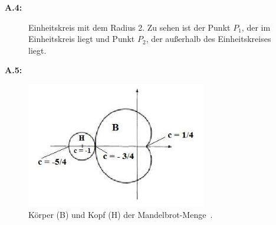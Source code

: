 \noindent\textbf{A.4:}\label{app:4}
\begin{figure}[H]\label{fig:escape-radius}
  \begin{center}
    \caption{
      Einheitskreis mit dem Radius 2. Zu sehen ist der Punkt $P_1$, der im
      Einheitskreis liegt und Punkt $P_2$, der außerhalb des Einheitskreises liegt.
    }
  \end{center}
\end{figure}

\noindent\textbf{A.5:}\label{app:5}
\begin{figure}[H]\label{fig:body-and-head-of-mandelbrot-set}
\begin{center}
  \includegraphics[width=0.7\textwidth]{images/bodyHeadMandelbrotSet}
  \caption{
    K\"orper (B) und Kopf (H) der Mandelbrot-Menge~\cite{mahanta_mandelbrot_2016}.
  }
\end{center}
\end{figure}

